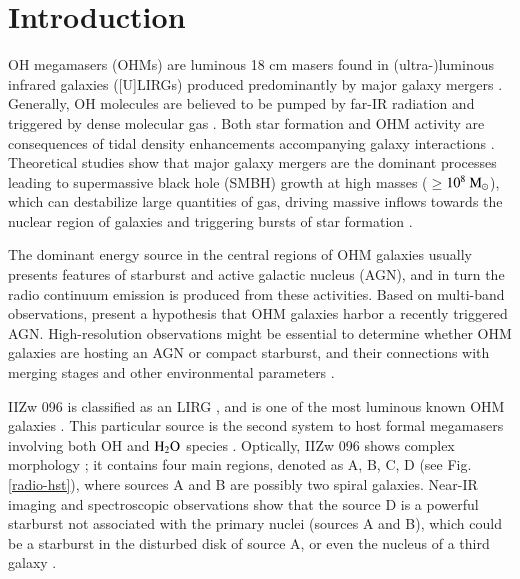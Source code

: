 \documentclass[]{aa} %
\begin{document}


   \maketitle
%
\section{Introduction}

OH megamasers (OHMs) are luminous 18 cm masers found in (ultra-)luminous infrared galaxies ([U]LIRGs) produced predominantly by major galaxy mergers \citep{2021ApJ...911...38R}. Generally, OH molecules are believed to be pumped by far-IR radiation \citep{2008ApJ...677..985L,2018JApA...39...34H} and triggered by dense molecular gas \citep{2007ApJ...669L...9D}. Both star formation and OHM activity are consequences of tidal density enhancements accompanying galaxy interactions \citep{2007ApJ...669L...9D}. Theoretical studies show that major galaxy mergers are the dominant processes leading to supermassive black hole (SMBH) growth at high masses  ($\geq$$\rm 10^8~M_{\odot}$), which can destabilize large quantities of gas, driving massive inflows towards the nuclear region of galaxies and triggering bursts of star formation \citep{2019NatAs...3...48S}.

The dominant energy source in the central regions of OHM galaxies usually presents features of starburst and active galactic nucleus (AGN), and in turn the radio continuum emission is produced from these activities.  Based on multi-band observations, \cite{2020MNRAS.498.2632H} present a hypothesis that OHM galaxies harbor a recently triggered AGN. High-resolution observations might be essential to determine whether OHM galaxies are hosting an AGN or compact starburst, and their connections with merging stages and other environmental parameters \citep[see][and references therein]{2020A&A...638A..78P}.

IIZw 096 is classified as an LIRG \citep{2010AJ....140...63I}, and is one of the most luminous known OHM galaxies \citep{1986IAUC.4231....2B}. This particular source is the second system to host formal megamasers involving both OH and $\rm H_{2}O$ species \citep{2013A&A...560A..12W,2016ApJ...816...55W}. Optically, IIZw 096 shows complex morphology \citep{2010AJ....140...63I}; it contains four main regions, denoted as A, B, C, D (see Fig. \ref{radio-hst}), where sources A and B are possibly two spiral galaxies. Near-IR imaging and spectroscopic observations show that the source D is a powerful starburst not associated with the primary nuclei (sources A and B), which could be a starburst in the disturbed disk of source A, or even the nucleus of a third galaxy \citep{1997AJ....113.1569G,2010AJ....140...63I}.
\end{document}
